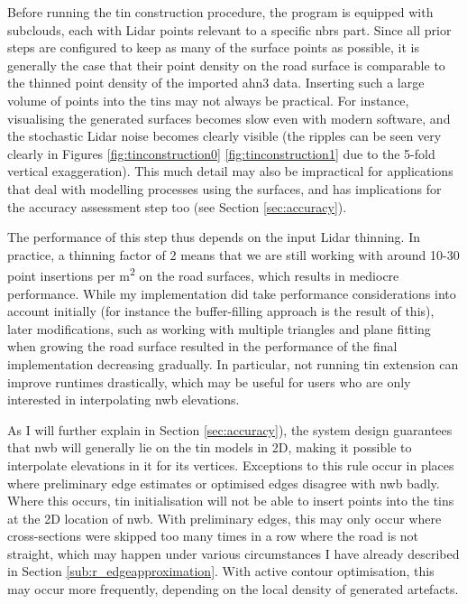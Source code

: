 Before running the \ac{tin} construction procedure, the program is equipped with subclouds, each with Lidar points relevant to a specific \ac{nbrs} part. Since all prior steps are configured to keep as many of the surface points as possible, it is generally the case that their point density on the road surface is comparable to the thinned point density of the imported \ac{ahn3} data. Inserting such a large volume of points into the \ac{tin}s may not always be practical. For instance, visualising the generated surfaces becomes slow even with modern software, and the stochastic Lidar noise becomes clearly visible (the ripples can be seen very clearly in Figures \ref{fig:tinconstruction0} \ref{fig:tinconstruction1} due to the 5-fold vertical exaggeration). This much detail may also be impractical for applications that deal with modelling processes using the surfaces, and has implications for the accuracy assessment step too (see Section \ref{sec:accuracy}).

The performance of this step thus depends on the input Lidar thinning. In practice, a thinning factor of 2 means that we are still working with around 10-30 point insertions per m\textsuperscript{2} on the road surfaces, which results in mediocre performance. While my implementation did take performance considerations into account initially (for instance the buffer-filling approach is the result of this), later modifications, such as working with multiple triangles and plane fitting when growing the road surface resulted in the performance of the final implementation decreasing gradually. In particular, not running \ac{tin} extension can improve runtimes drastically, which may be useful for users who are only interested in interpolating \ac{nwb} elevations.

As I will further explain in Section \ref{sec:accuracy}), the system design guarantees that \ac{nwb} will generally lie on the \ac{tin} models in 2D, making it possible to interpolate elevations in it for its vertices. Exceptions to this rule occur in places where preliminary edge estimates or optimised edges disagree with \ac{nwb} badly. Where this occurs, \ac{tin} initialisation will not be able to insert points into the \ac{tin}s at the 2D location of \ac{nwb}. With preliminary edges, this may only occur where cross-sections were skipped too many times in a row where the road is not straight, which may happen under various circumstances I have already described in Section \ref{sub:r_edgeapproximation}. With active contour optimisation, this may occur more frequently, depending on the local density of generated artefacts.

